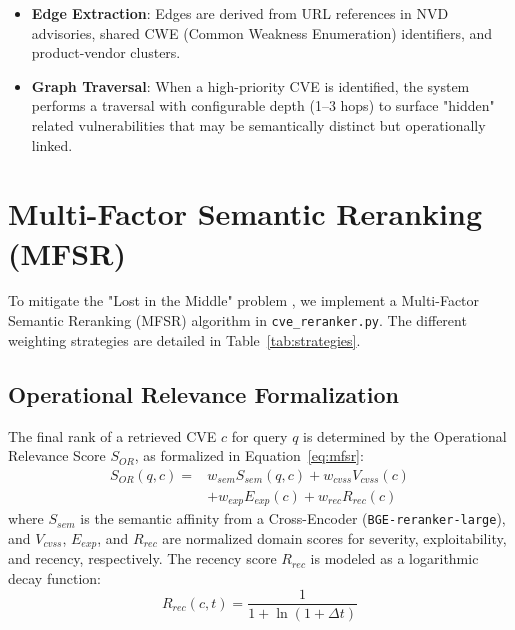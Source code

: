 \begin{itemize}
    \item \textbf{Edge Extraction}: Edges are derived from URL references in NVD advisories, shared CWE (Common Weakness Enumeration) identifiers, and product-vendor clusters.
    \item \textbf{Graph Traversal}: When a high-priority CVE is identified, the system performs a traversal with configurable depth (1–3 hops) to surface "hidden" related vulnerabilities that may be semantically distinct but operationally linked.
\end{itemize}

\section{Multi-Factor Semantic Reranking (MFSR)}
\label{sec:reranking}
To mitigate the "Lost in the Middle" problem \cite{lostmiddle}, we implement a Multi-Factor Semantic Reranking (MFSR) algorithm in \texttt{cve\_reranker.py}. The different weighting strategies are detailed in Table~\ref{tab:strategies}.

\begin{table}[htbp]
    \centering
    \caption{Multi-Factor Semantic Reranking (MFSR) Strategy Matrix}
    \label{tab:strategies}
    \resizebox{\columnwidth}{!}{}
\end{table}

\subsection{Operational Relevance Formalization}
The final rank of a retrieved CVE $c$ for query $q$ is determined by the Operational Relevance Score $S_{OR}$, as formalized in Equation~\ref{eq:mfsr}:
\begin{equation}
\begin{aligned}
S_{OR}(q, c) = & w_{sem} S_{sem}(q, c) + w_{cvss} V_{cvss}(c) \\
& + w_{exp} E_{exp}(c) + w_{rec} R_{rec}(c)
\end{aligned}
\label{eq:mfsr}
\end{equation}
where $S_{sem}$ is the semantic affinity from a Cross-Encoder (\texttt{BGE-reranker-large}), and $V_{cvss}$, $E_{exp}$, and $R_{rec}$ are normalized domain scores for severity, exploitability, and recency, respectively. The recency score $R_{rec}$ is modeled as a logarithmic decay function:
\begin{equation}
R_{rec}(c, t) = \frac{1}{1 + \ln(1 + \Delta t)}
\label{eq:recency}
\end{equation}

